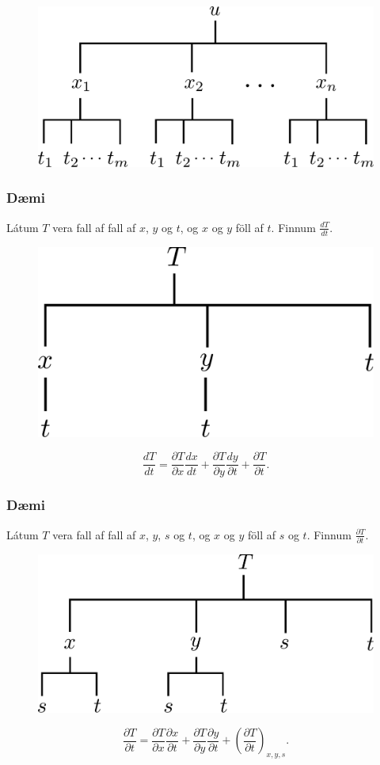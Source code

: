 \begin{figure}[h!]
           \centering
            \includegraphics[width=0.45\linewidth]{chain3}
    \end{figure}


\subsubsection{Dæmi }
Látum $T$ vera fall af fall af $x$, $y$ og $t$, og $x$ og $y$ föll af $t$. Finnum $\frac{ dT}{dt}$.

\begin{figure}[h!]
           \centering
            \includegraphics[width=0.35\linewidth]{chain5}
    \end{figure}
$$\frac{d T}{d t} = \frac{\partial T}{\partial x} \frac{d x}{d t} +\frac{\partial T}{\partial y} \frac{d y}{\partial t} + \frac{\partial T}{\partial t} .$$


\subsubsection{Dæmi }
Látum $T$ vera fall af fall af $x$, $y$, $s$ og $t$, og $x$ og $y$ föll af $s$ og $t$. Finnum $\frac{ \partial T}{\partial t}$.

\begin{figure}[h!]
           \centering
            \includegraphics[width=0.45\linewidth]{chain6}
    \end{figure}
$$\frac{\partial T}{\partial t} = \frac{\partial T}{\partial x} \frac{\partial x}{\partial t} +\frac{\partial T}{\partial y} \frac{\partial y}{\partial t} + \left(\frac{\partial T}{\partial t}\right)_{x,y,s} .$$


